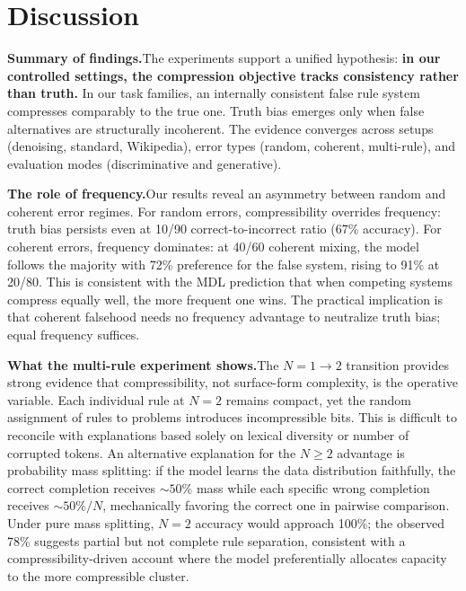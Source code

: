 \documentclass{article}
\begin{document}
\section{Discussion}
\label{sec:discussion}

\textbf{Summary of findings.}\quad The experiments support a unified hypothesis: \textbf{in our controlled settings, the compression objective tracks consistency rather than truth.} In our task families, an internally consistent false rule system compresses comparably to the true one. Truth bias emerges only when false alternatives are structurally incoherent. The evidence converges across setups (denoising, standard, Wikipedia), error types (random, coherent, multi-rule), and evaluation modes (discriminative and generative).

\textbf{The role of frequency.}\quad Our results reveal an asymmetry between random and coherent error regimes. For random errors, compressibility overrides frequency: truth bias persists even at 10/90 correct-to-incorrect ratio (67\% accuracy). For coherent errors, frequency dominates: at 40/60 coherent mixing, the model follows the majority with 72\% preference for the false system, rising to 91\% at 20/80. This is consistent with the MDL prediction that when competing systems compress equally well, the more frequent one wins. The practical implication is that coherent falsehood needs no frequency advantage to neutralize truth bias; equal frequency suffices.

\textbf{What the multi-rule experiment shows.}\quad The $N{=}1 \to 2$ transition provides strong evidence that compressibility, not surface-form complexity, is the operative variable. Each individual rule at $N{=}2$ remains compact, yet the random assignment of rules to problems introduces incompressible bits. This is difficult to reconcile with explanations based solely on lexical diversity or number of corrupted tokens. An alternative explanation for the $N \geq 2$ advantage is probability mass splitting: if the model learns the data distribution faithfully, the correct completion receives ${\sim}50\%$ mass while each specific wrong completion receives ${\sim}50\%/N$, mechanically favoring the correct one in pairwise comparison. Under pure mass splitting, $N{=}2$ accuracy would approach 100\%; the observed 78\% suggests partial but not complete rule separation, consistent with a compressibility-driven account where the model preferentially allocates capacity to the more compressible cluster.
\end{document}
